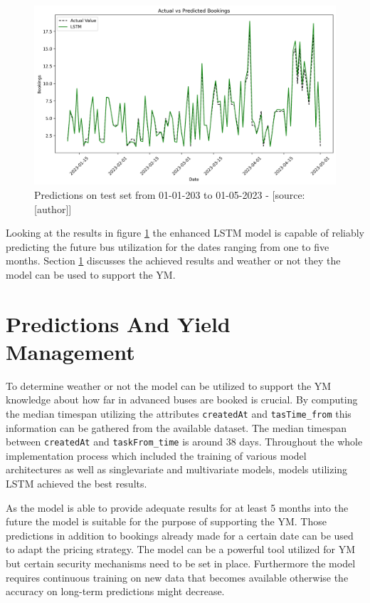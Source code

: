\begin{figure}[H]
	\centering
		\includegraphics[width=14cm]{images/lstm_multi_1_prediction}
	\caption{Predictions on test set from 01-01-203 to 01-05-2023 - [source:[author]]}
	\label{fig:lstm_multi_1_prediction}
\end{figure}
Looking at the results in figure \ref{fig:lstm_multi_1_prediction} the enhanced LSTM model is capable of reliably predicting the future bus utilization for the dates ranging from one to five months. Section \ref{sec:pred_and_ym} discusses the achieved results and weather or not they the model can be used to support the YM.

\section{Predictions And Yield Management}
\label{sec:pred_and_ym}
To determine weather or not the model can be utilized to support the YM knowledge about how far in advanced buses are booked is crucial. By computing the median timespan utilizing the attributes \verb|createdAt| and \verb|tasTime_from| this information can be gathered from the available dataset. The median timespan between \verb|createdAt| and \verb|taskFrom_time| is around 38 days. Throughout the whole implementation process which included the training of various model architectures as well as singlevariate and multivariate models, models utilizing LSTM achieved the best results. 

As the model is able to provide adequate results for at least 5 months into the future the model is suitable for the purpose of supporting the YM.  Those predictions in addition to bookings already made for a certain date can be used  to adapt the pricing strategy.
The model can be a powerful tool utilized for YM but certain security mechanisms need to be set in place. Furthermore the model requires continuous training on new data that becomes available otherwise the accuracy on long-term predictions might decrease. 